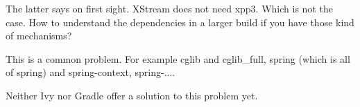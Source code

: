 The latter says on first sight. XStream does not need xpp3. Which is not the case. How to understand the dependencies in a larger build if you have those kind of mechanisms?

This is a common problem. For example cglib and cglib\_full, spring (which is all of spring) and spring-context, spring-....

Neither Ivy nor Gradle offer a solution to this problem yet.


